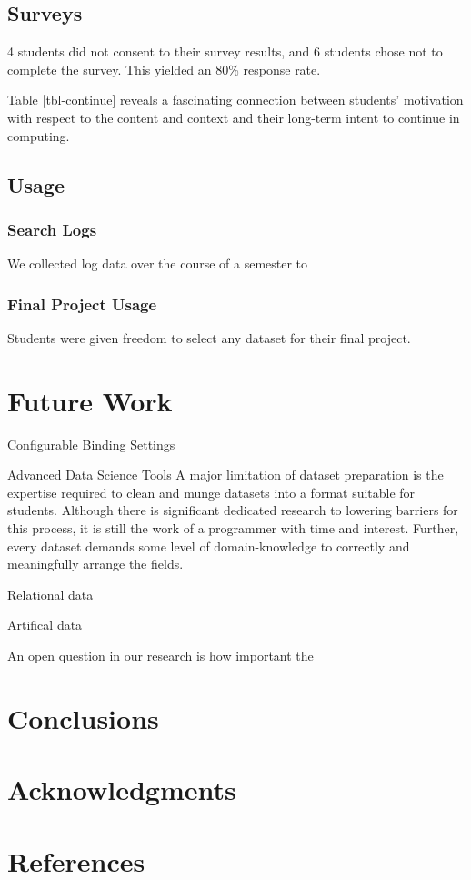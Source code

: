 \documentclass{sig-alternate}
\begin{document}
\subsection{Surveys}

4 students did not consent to their survey results, and 6 students chose not to complete the survey.
This yielded an 80\% response rate.

Table \ref{tbl-continue} reveals a fascinating connection between students' motivation with respect to the content and context and their long-term intent to continue in computing.

\subsection{Usage}

\subsubsection{Search Logs}

We collected log data over the course of a semester to 

\subsubsection{Final Project Usage}

Students were given freedom to select any dataset for their final project.

\section{Future Work}

Configurable Binding Settings

Advanced Data Science Tools
A major limitation of dataset preparation is the expertise required to clean and munge datasets into a format suitable for students.
Although there is significant dedicated research to lowering barriers for this process, it is still the work of a programmer with time and interest.
Further, every dataset demands some level of domain-knowledge to correctly and meaningfully arrange the fields.

Relational data

Artifical data

An open question in our research is how important the 

\section{Conclusions}


\section{Acknowledgments}


\section{References}

\thebibliography{}
\end{document}
